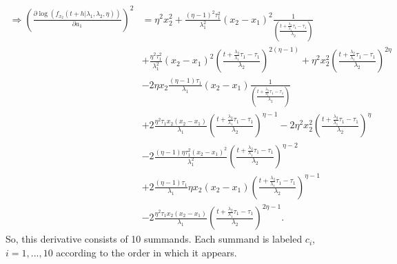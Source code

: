 \documentclass{article}
\begin{document}
\begin{align*}
\Rightarrow \left(\frac{\partial \log\left(f_{x_2}(t+h|\lambda_1,\lambda_2,\eta)\right)}{\partial a_1}\right)^{2}&=\eta^2 x_2^2 +\frac{(\eta-1)^2\tau_1^2}{\lambda_1^2}(x_2-x_1)^2\frac{1}{\left(\frac{t+\frac{\lambda_2}{\lambda_1}\tau_1-\tau_1}{\lambda_2}\right)}
\\
&+\frac{\eta^2\tau_1^2}{\lambda_1^2}(x_2-x_1)^2\left(\frac{t+\frac{\lambda_2}{\lambda_1}\tau_1-\tau_1}{\lambda_2}\right)^{2(\eta-1)}+\eta^2x_2^2\left(\frac{t+\frac{\lambda_2}{\lambda_1}\tau_1-\tau_1}{\lambda_2}\right)^{2\eta}
\\
&-2\eta x_2\frac{(\eta-1)\tau_1}{\lambda_1}(x_2-x_1)\frac{1}{\left(\frac{t+\frac{\lambda_2}{\lambda_1}\tau_1-\tau_1}{\lambda_2}\right)}
\\
&+2\frac{\eta^2\tau_1 x_2(x_2-x_1)}{\lambda_1}\left(\frac{t+\frac{\lambda_2}{\lambda_1}\tau_1-\tau_1}{\lambda_2}\right)^{\eta-1} -2\eta^2x_2^2\left(\frac{t+\frac{\lambda_2}{\lambda_1}\tau_1-\tau_1}{\lambda_2}\right)^{\eta}
\\
&-2\frac{(\eta-1) \eta\tau_1^2(x_2-x_1)^2}{\lambda_1^2}\left(\frac{t+\frac{\lambda_2}{\lambda_1}\tau_1-\tau_1}{\lambda_2}\right)^{\eta-2}
\\
&+2\frac{(\eta-1)\tau_1}{\lambda_1}\eta x_2 (x_2-x_1)\left(\frac{t+\frac{\lambda_2}{\lambda_1}\tau_1-\tau_1}{\lambda_2}\right)^{\eta-1}
\\
&-2\frac{\eta^2\tau_1 x_2 (x_2-x_1)}{\lambda_1}\left(\frac{t+\frac{\lambda_2}{\lambda_1}\tau_1-\tau_1}{\lambda_2}\right)^{2\eta-1}.
\end{align*}
So, this derivative consists of 10 summands. Each summand is labeled $c_i$, $i=1,..., 10$ according to the order in which it appears.
\end{document}

